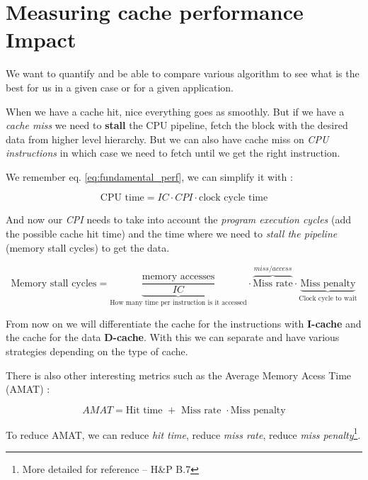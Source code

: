 \documentclass{report}
\begin{document}
\section{Measuring cache performance Impact}

We want to quantify and be able to compare various algorithm to see what is the best for us in a given case or for a given application.

When we have a cache hit, nice everything goes as smoothly. But if we have a \textit{cache miss} we need to \textbf{stall} the CPU pipeline, fetch the block with the desired data from higher level hierarchy. But we can also have cache miss on \textit{CPU instructions} in which case we need to fetch until we get the right instruction.

We remember eq. \ref{eq:fundamental_perf}, we can simplify it with :

\begin{equation}
    \text{CPU time} = IC \cdot CPI \cdot \text{clock cycle time}
\end{equation}

And now our \textit{CPI} needs to take into account the \textit{program execution cycles} (add the possible cache hit time) and the time where we need to \textit{stall the pipeline} (memory stall cycles) to get the data.

\begin{equation}
     \text{Memory stall cycles} = \underbrace{\frac{\text{memory accesses}}{IC}}_{\text{How many time per instruction is it accessed}} \cdot \overbrace{\text{Miss rate}}^{miss/access} \cdot \underbrace{\text{Miss penalty}}_{\text{Clock cycle to wait}}
\end{equation}

From now on we will differentiate the cache for the instructions with \textbf{I-cache} and the cache for the data \textbf{D-cache}. With this we can separate and have various strategies depending on the type of cache.

There is also other interesting metrics such as the Average Memory Acess Time (AMAT) :

\begin{equation}
    AMAT = \text{Hit time } + \text{ Miss rate } \cdot \text{Miss penalty} 
\end{equation}

To reduce AMAT, we can reduce \textit{hit time}, reduce \textit{miss rate}, reduce \textit{miss penalty}\footnote{More detailed for reference – H\&P B.7}.
\end{document}
